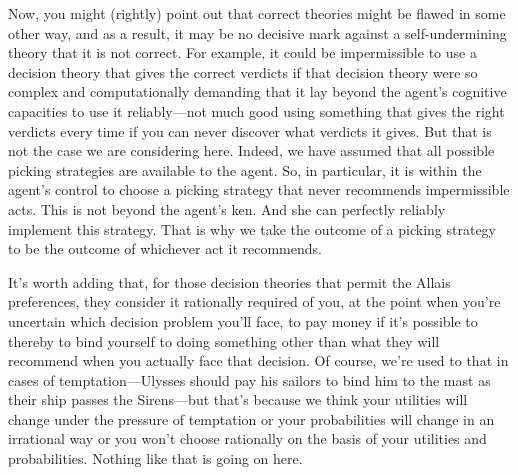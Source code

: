\documentclass[a4paper]{article}
\newcommand\s{\mathsf{s}}
\renewcommand{\color}[1]{}
\newenvironment{CCM rewritten}
{\begingroup\color{blue}} %
{\endgroup}              %
\begin{document}
{Now, you might (rightly) point out that correct theories might be flawed in some other way, and as a result, it may be no decisive mark against a self-undermining theory that it is not correct. For example,} it could be impermissible to use a decision theory that gives the correct verdicts if that decision theory were so complex and computationally demanding that it lay beyond the agent's cognitive capacities to use it reliably---not much good using something that gives the right verdicts every time if you can never discover what verdicts it gives. But that is not the case we are considering here. {Indeed, we have assumed that all possible picking strategies are available to the agent. So, in particular, it is within the agent's control to choose a picking strategy that never recommends impermissible acts. This is not beyond the agent's ken. And she can perfectly reliably implement this strategy. That is why we take the outcome of a picking strategy to be the outcome of whichever act it recommends.}


It's worth adding that, for those decision theories that permit the Allais preferences, they consider it rationally required of you, at the point when you're uncertain which decision problem you'll face, to pay money if it's possible to thereby to bind yourself to doing something other than what they will recommend when you actually face that decision. Of course, we're used to that in cases of temptation---Ulysses should pay his sailors to bind him to the mast as their ship passes the Sirens---but that's because we think your utilities will change under the pressure of temptation or your probabilities will change in an irrational way or you won't choose rationally on the basis of your utilities and probabilities. Nothing like that is going on here.

\end{document}
